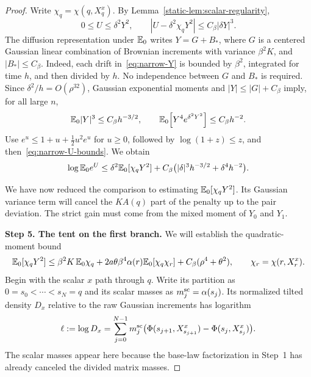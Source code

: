 \begin{proof}
Write $\chi_q=\chi(q,X_q^x)$. By Lemma~\ref{static-lem:scalar-regularity},
\begin{equation}\label{eq:narrow-U-bounds}
 0\le U\le\delta^2Y^2,\qquad
 |U-\delta^2\chi_qY^2|\le C_\beta|\delta Y|^3.
\end{equation}
The diffusion representation under $\mathbb E_0$ writes $Y=G+B_*$,
where $G$ is a centered Gaussian linear combination of Brownian
increments with variance $\beta^2K$, and $|B_*|\le C_\beta$.
Indeed, each drift in~\eqref{eq:narrow-Y} is bounded by
$\beta^2$, integrated for time $h$, and then divided by $h$.
No independence between $G$ and $B_*$ is required. Since
$\delta^2/h=O(\rho^{32})$, Gaussian exponential moments and
$|Y|\le|G|+C_\beta$ imply, for all large $n$,
\[
 \mathbb E_0|Y|^3\le C_\beta h^{-3/2},\qquad
 \mathbb E_0\!\left[Y^4e^{\delta^2Y^2}\right]\le C_\beta h^{-2}.
\]
Use $e^u\le1+u+\tfrac12u^2e^u$ for $u\ge0$, followed by
$\log(1+z)\le z$, and then~\eqref{eq:narrow-U-bounds}. We obtain
\begin{equation}\label{eq:narrow-exponential-error}
 \log\mathbb E_0e^U
 \le \delta^2\mathbb E_0[\chi_qY^2]
      +C_\beta\bigl(|\delta|^3h^{-3/2}+\delta^4h^{-2}\bigr).
\end{equation}

We have now reduced the comparison to estimating
$\mathbb E_0[\chi_qY^2]$. Its Gaussian variance term will cancel the
$KA(q)$ part of the penalty up to the pair deviation. The strict
gain must come from the mixed moment of $Y_0$ and $Y_1$.

\par\medskip\noindent\textbf{Step 5. The tent on the first branch.}\enspace
We will establish the quadratic-moment bound
\begin{equation}\label{eq:narrow-quadratic}
 \mathbb E_0[\chi_qY^2]
 \le\beta^2K\,\mathbb E_0\chi_q
    +2a\theta\beta^4\alpha(r)\mathbb E_0[\chi_q\chi_r]
    +C_\beta(\rho^4+\theta^2),
 \qquad \chi_r=\chi(r,X_r^x).
\end{equation}
Begin with the scalar $x$ path through $q$. Write its partition as
$0=s_0<\cdots<s_N=q$ and its scalar masses as
$m_j^{\rm sc}=\alpha(s_j)$. Its normalized tilted density $D_x$
relative to the raw Gaussian increments has logarithm
\begin{equation}\label{eq:narrow-density}
 \ell:=\log D_x
 =\sum_{j=0}^{N-1}m_j^{\rm sc}
    \bigl(\Phi(s_{j+1},X^x_{s_{j+1}})
                  -\Phi(s_j,X^x_{s_j})\bigr).
\end{equation}
The scalar masses appear here because the base-law factorization
in Step~1 has already canceled the divided matrix masses.


\end{proof}
